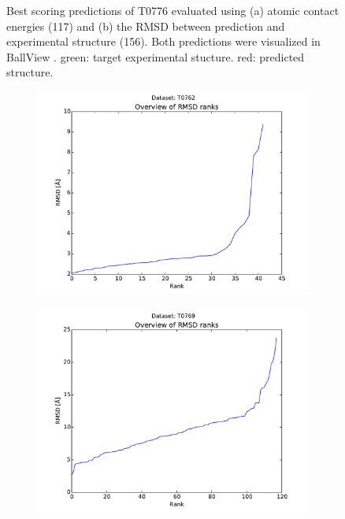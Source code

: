 \documentclass[11pt,a4paper]{article}
\renewcommand{\(}{\left (}
\renewcommand{\)}{\right )}
\begin{document}
\begin{figure}[!h]
\begin{subfigure}{.5\textwidth}
		\subcaption{}
	\end{subfigure}
	\caption{Best scoring predictions of T0776 evaluated using (a) atomic contact energies (117) and (b) the RMSD between prediction and experimental structure (156). Both predictions were visualized in BallView \citep{ballview}. green: target experimental stucture. red: predicted structure.}
\end{figure}

\begin{figure}[!h]
	\begin{subfigure}{.5\textwidth}
		\includegraphics[width=\textwidth]{../results/rank_T0762}
		\subcaption{}
	\end{subfigure}
	\begin{subfigure}{.5\textwidth}
		\includegraphics[width=\textwidth]{../results/rank_T0769}

\end{subfigure}
\end{figure}
\end{document}

